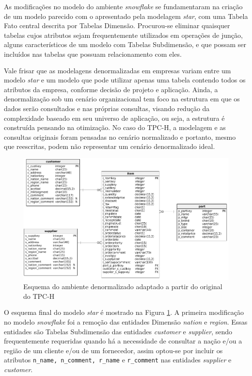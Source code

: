 As modificações no modelo do ambiente \textit{snowflake} se fundamentaram na criação de um modelo parecido com o apresentado pela modelagem \textit{star}, com uma Tabela Fato central descrita por Tabelas Dimensão. Procurou-se eliminar quaisquer tabelas cujos atributos sejam frequentemente utilizados em operações de junção, alguns característicos de um modelo com Tabelas Subdimensão, e que possam ser incluídos nas tabelas que possuam relacionamento com eles.

Vale frisar que as modelagens denormalizadas em empresas variam entre um modelo \textit{star} e um modelo que pode utilizar apenas uma tabela contendo todos os atributos da empresa, conforme decisão de projeto e aplicação. Ainda, a denormalização sob um cenário organizacional tem foco na estrutura em que os dados serão consultados e nas próprias consultas, visando redução da complexidade baseado em seu universo de aplicação, ou seja, a estrutura é construída pensando na otimização. No caso do TPC-H, a modelagem e as consultas originais foram pensadas no cenário normalizado e portanto, mesmo que reescritas, podem não representar um cenário denormalizado ideal.

\begin{figure}[h]
	\centering
		\includegraphics[width=\textwidth]{img/star.png}
	\caption{Esquema do ambiente denormalizado adaptado a partir do original do TPC-H}
	\label{fig:star}
\end{figure}
 
O esquema final do modelo \textit{star} é mostrado na Figura \ref{fig:star}. A primeira modificação no modelo \textit{snowflake} foi a remoção das entidades Dimensão \textit{nation} e \textit{region}. Essas entidades são Tabelas Subdimensão das entidades \textit{customer} e \textit{supplier}, sendo frequentemente requeridas quando há a necessidade de consultar a nação e/ou a região de um cliente e/ou de um fornecedor, assim optou-se por incluir os atributos \texttt{n\_name, n\_comment, r\_name} e \texttt{r\_comment} nas entidades \textit{supplier} e \textit{customer}. 

